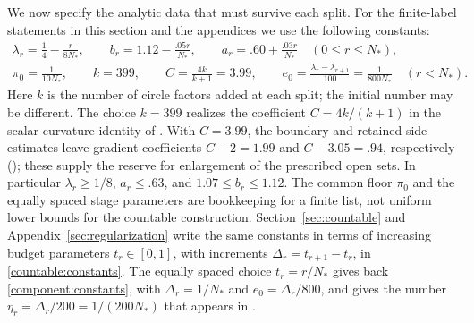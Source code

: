 We now specify the analytic data that must survive each split.
For the finite-label statements in this section and the appendices we
use the following constants:
\begin{equation}\label{component:constants}
\begin{gathered}
 \lambda_r=\frac14-\frac{r}{8N_*},\qquad
 b_r=1.12-\frac{.05r}{N_*},\qquad
 a_r=.60+\frac{.03r}{N_*}\quad(0\le r\le N_*),\\
 \pi_0=\frac{1}{10N_*},\qquad k=399,\qquad
 C=\frac{4k}{k+1}=3.99,\qquad
 e_0=\frac{\lambda_r-\lambda_{r+1}}{100}
     =\frac{1}{800N_*}\quad(r<N_*).
\end{gathered}
\end{equation}
Here $k$ is the number of circle factors added at each split; the initial
number may be different. The choice $k=399$ realizes the coefficient
$C=4k/(k+1)$ in the scalar-curvature identity of .
With $C=3.99$, the boundary and retained-side estimates leave gradient
coefficients $C-2=1.99$ and $C-3.05=.94$, respectively
(); these supply the reserve for enlargement of the prescribed open sets.
In particular $\lambda_r\ge1/8$, $a_r\le.63$,
and $1.07\le b_r\le1.12$.  The common floor $\pi_0$ and the equally
spaced stage parameters are bookkeeping for a finite list, not uniform
lower bounds for the countable construction. Section~\ref{sec:countable}
and Appendix~\ref{sec:regularization} write the same constants in terms
of increasing budget parameters \(t_r\in[0,1]\), with increments
\(\Delta_r=t_{r+1}-t_r\), in \eqref{countable:constants}. The equally
spaced choice \(t_r=r/N_*\) gives back \eqref{component:constants}, with
\(\Delta_r=1/N_*\) and \(e_0=\Delta_r/800\), and gives the number
\(\eta_r=\Delta_r/200=1/(200N_*)\) that appears in .

